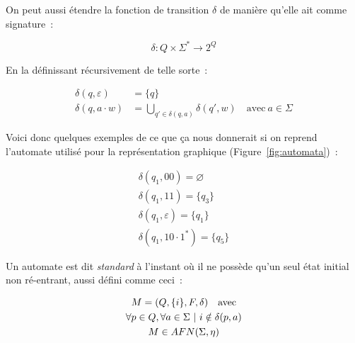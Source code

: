 

\vphantom{}

On peut aussi étendre la fonction de transition \(\delta\) de manière qu'elle
ait comme signature~:

\[
    \delta: Q \times \Sigma^* \to 2^Q
\]

En la définissant récursivement de telle sorte~:

\begin{align*}
    \delta(q, \varepsilon) & = \{q\}                                                                       \\
    \delta(q, a \cdot w)   & = \bigcup_{q' \in \delta(q, a)} \delta(q', w) \quad \text{avec}~ a \in \Sigma
\end{align*}

\begin{example}
    Voici donc quelques exemples de ce que ça nous donnerait si on reprend
    l'automate utilisé pour la représentation graphique
    (Figure~\ref{fig:automata})~:

    \begin{gather*}
        \delta(q_1, 00) = \varnothing \\
        \delta(q_1, 11) = \{q_3\} \\
        \delta(q_1, \varepsilon) = \{q_1\} \\
        \delta(q_1, 10 \cdot 1^*) = \{q_5\}
    \end{gather*}
\end{example}

\vphantom{}

\begin{definition}
    Un automate est dit \textit{standard} à l'instant où il ne possède qu'un
    seul état initial non ré-entrant, aussi défini comme ceci~:

    \begin{gather*}
        M = (Q, \{i\}, F, \delta) \quad \text{avec} \\
        \forall p \in Q, \forall a \in \Sigma ~|~ i \notin \delta(p, a) \notag \\
        M \in AFN(\Sigma, \eta) \notag
    \end{gather*}
\end{definition}

